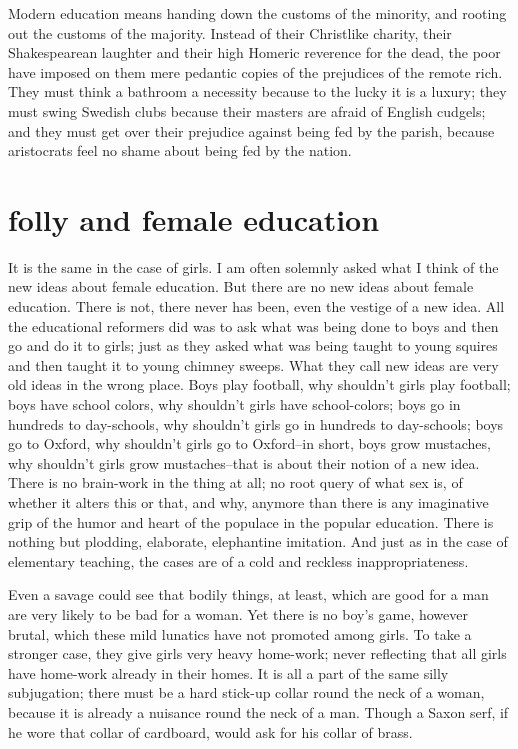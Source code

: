 \documentclass[final,10pt,letterpaper,twocolumn,openany]{book}
\begin{document}
Modern education
means handing down the customs of the minority, and rooting out the
customs of the majority. Instead of their Christlike charity, their
Shakespearean laughter and their high Homeric reverence for the dead, the
poor have imposed on them mere pedantic copies of the prejudices of the
remote rich. They must think a bathroom a necessity because to the lucky
it is a luxury; they must swing Swedish clubs because their masters are
afraid of English cudgels; and they must get over their prejudice against
being fed by the parish, because aristocrats feel no shame about being fed
by the nation.

\section{folly and female education}

    It is the same in the case of girls. I am often solemnly asked what I
think of the new ideas about female education. But there are no new ideas
about female education. There is not, there never has been, even the
vestige of a new idea. All the educational reformers did was to ask what
was being done to boys and then go and do it to girls; just as they asked
what was being taught to young squires and then taught it to young
chimney sweeps. What they call new ideas are very old ideas in the wrong
place. Boys play football, why shouldn't girls play football; boys have
school colors, why shouldn't girls have school-colors; boys go in hundreds
to day-schools, why shouldn't girls go in hundreds to day-schools; boys go
to Oxford, why shouldn't girls go to Oxford--in short, boys grow
mustaches, why shouldn't girls grow mustaches--that is about their notion
of a new idea. There is no brain-work in the thing at all; no root query of
what sex is, of whether it alters this or that, and why, anymore than there is
any imaginative grip of the humor and heart of the populace in the popular
education. There is nothing but plodding, elaborate, elephantine imitation.
And just as in the case of elementary teaching, the cases are of a cold and
reckless inappropriateness. 

Even a savage could see that bodily things, at
least, which are good for a man are very likely to be bad for a woman. Yet
there is no boy's game, however brutal, which these mild lunatics have not
promoted among girls. To take a stronger case, they give girls very heavy
home-work; never reflecting that all girls have home-work already in their
homes. It is all a part of the same silly subjugation; there must be a hard
stick-up collar round the neck of a woman, because it is already a nuisance
round the neck of a man. Though a Saxon serf, if he wore that collar of
cardboard, would ask for his collar of brass.
\end{document}
